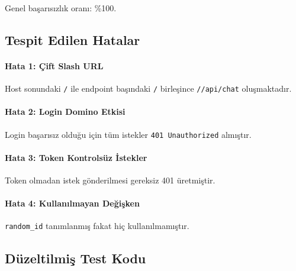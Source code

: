 \documentclass[12pt,a4paper]{article}
\begin{document}
Genel ba\c{s}ar{\i}s{\i}zl{\i}k oran{\i}: \%100.

\subsection{Tespit Edilen Hatalar}

\paragraph{Hata 1: \c{C}ift Slash URL}
Host sonundaki \texttt{/} ile endpoint ba\c{s}{\i}ndaki \texttt{/} birle\c{s}ince \texttt{//api/chat} olu\c{s}maktad{\i}r.

\paragraph{Hata 2: Login Domino Etkisi}
Login ba\c{s}ar{\i}s{\i}z oldu\u{g}u i\c{c}in t\"{u}m istekler \texttt{401 Unauthorized} alm{\i}\c{s}t{\i}r.

\paragraph{Hata 3: Token Kontrols\"{u}z \.{I}stekler}
Token olmadan istek g\"{o}nderilmesi gereksiz 401 \"{u}retmi\c{s}tir.

\paragraph{Hata 4: Kullan{\i}lmayan De\u{g}i\c{s}ken}
\texttt{random\_id} tan{\i}mlanm{\i}\c{s} fakat hi\c{c} kullan{\i}lmam{\i}\c{s}t{\i}r.

\subsection{D\"{u}zeltilmi\c{s} Test Kodu}
\end{document}
